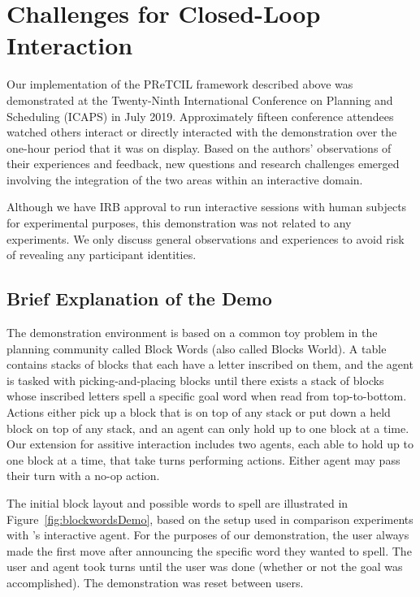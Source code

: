 \documentclass[letterpaper]{article} %
\begin{document}
\section{Challenges for Closed-Loop Interaction \label{sec:challenges}}
Our implementation of the {\sc PReTCIL} framework described above was demonstrated at the Twenty-Ninth International Conference on Planning and Scheduling (ICAPS) in July 2019.  Approximately fifteen conference attendees watched others interact or directly interacted with the demonstration over the one-hour period that it was on display.  Based on the authors' observations of their experiences and feedback, new questions and research challenges emerged involving the integration of the two areas within an interactive domain.

Although we have IRB approval to run interactive sessions with human subjects for experimental purposes, this demonstration was not related to any experiments. %
 We %
 only discuss general observations and experiences to avoid risk of revealing any participant identities.

\subsection{Brief Explanation of the Demo\label{sec:challenges.demo}}
The demonstration environment is based on a common toy problem in the planning community called Block Words (also called Blocks World).  A table contains stacks of blocks that each have a letter inscribed on them, and the agent is tasked with picking-and-placing blocks until there exists a stack of blocks whose inscribed letters spell a specific goal word when read from top-to-bottom.  Actions either pick up a block that is on top of any stack or put down a held block on top of any stack, and an agent can only hold up to one block at a time.  Our extension for assitive interaction includes two agents, each able to hold up to one block at a time, that take turns performing actions.  Either agent may pass their turn with a no-op action.

The initial block layout and possible words to spell are illustrated in Figure~\ref{fig:blockwordsDemo}, based on the setup %
 used in comparison experiments with \citeauthor{thesis_levine}'s  interactive agent. %
 For the purposes of our demonstration, the user always made the first move after announcing the specific word they wanted to spell. %
 The user and agent took turns until the user was done (whether or not the goal was accomplished).  The demonstration was reset between users. %
 
\end{document}
